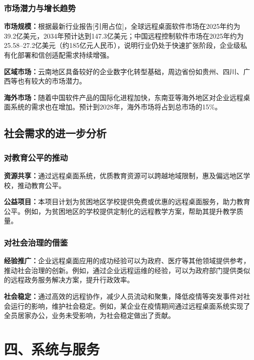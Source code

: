 \documentclass[12pt,a4paper]{article}
\renewcommand{\cite}[1]{[引用占位]}
\begin{document}
\subsubsection{市场潜力与增长趋势}
\textbf{市场规模：}根据最新行业报告\cite{fbi2026remote,qyresearch2026remote,yhresearch2026remote}，全球远程桌面软件市场在2025年约为39.2亿美元，2034年预计达到147.3亿美元；中国远程控制软件市场在2025年约为25.58--27.2亿美元（约185亿元人民币），说明行业仍处于快速扩张阶段，企业级私有化部署和信创适配需求持续增强。

\textbf{区域市场：}云南地区具备较好的企业数字化转型基础，周边省份如贵州、四川、广西等也有较大的市场潜力。

\textbf{海外市场：}随着中国软件产品的国际化进程加快，东南亚等海外地区对企业远程桌面系统的需求也在增加。预计到2028年，海外市场将占到总市场的15\%。

\subsection{社会需求的进一步分析}

\subsubsection{对教育公平的推动}
\textbf{资源共享：}通过远程桌面系统，优质教育资源可以跨越地域限制，惠及偏远地区学校，推动教育公平。

\textbf{公益项目：}本项目计划为贫困地区学校提供免费或优惠的远程桌面服务，助力教育公平。例如，为贫困地区的学校提供定制化的远程教学方案，帮助其提升教学质量。

\subsubsection{对社会治理的借鉴}
\textbf{经验推广：}企业远程桌面应用的成功经验可以为政府、医疗等其他领域提供参考，推动社会治理的创新。例如，通过企业远程运维的经验，可以为政府部门提供类似的远程政务服务解决方案，提升行政效率。

\textbf{社会稳定：}通过高效的远程协作，减少人员流动和聚集，降低疫情等突发事件对社会运行的影响，维护社会稳定。例如，某企业在疫情期间通过远程桌面系统实现了全员居家办公，业务未受影响，为社会稳定做出了贡献。

\section{四、系统与服务}
\end{document}
